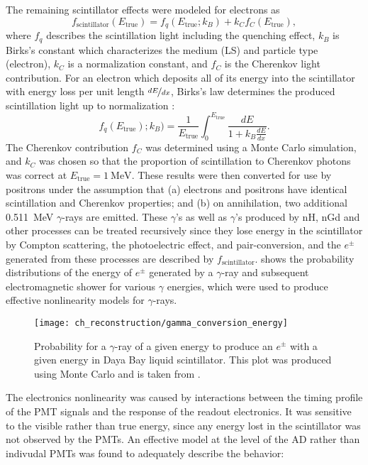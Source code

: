 The remaining scintillator effects were modeled for electrons as
\begin{equation}
    f_{\text{scintillator}}(E_{\text{true}}) =
    f_q(E_{\text{true}};k_B) + k_Cf_C(E_{\text{true}}),
\end{equation}
where $f_q$ describes the scintillation light including the quenching effect,
$k_B$ is Birks's constant which characterizes the medium (LS)
and particle type (electron),
$k_C$ is a normalization constant,
and $f_C$ is the Cherenkov light contribution.
For an electron which deposits all of its energy into the scintillator
with energy loss per unit length $\nicefrac{dE}{dx}$,
Birks's law determines the produced scintillation light up to normalization \cite{birks}:
\begin{equation}
    f_q(E_{\text{true}});k_B) = \frac{1}{E_{\text{true}}} \int_0^{E_{\text{true}}}
    \frac{dE}{1+k_B\frac{dE}{dx}}.
\end{equation}
The Cherenkov contribution $f_C$ was determined using a Monte Carlo simulation,
and $k_C$ was chosen so that the proportion of scintillation to Cherenkov photons
was correct at $E_{\text{true}} = \SI{1}{\MeV}$.
These results were then converted for use by positrons under the assumption that
(a) electrons and positrons have identical scintillation and Cherenkov properties;
and (b) on annihilation, two additional \SI{0.511}{\MeV} $\gamma$-rays are emitted.
These $\gamma$'s as well as $\gamma$'s produced by nH, nGd and other processes
can be treated recursively
since they lose energy in the scintillator
by Compton scattering, the photoelectric effect, and pair-conversion,
and the $e^{\pm}$ generated from these processes
are described by $f_{\text{scintillator}}$.
 shows the probability distributions
of the energy of $e^{\pm}$ generated by a $\gamma$-ray
and subsequent electromagnetic shower for various $\gamma$ energies,
which were used to produce effective nonlinearity models for $\gamma$-rays.

\begin{figure}
    \centering
    \texttt{[image: ch\_reconstruction/gamma\_conversion\_energy]}
    \caption{
        Probability for a $\gamma$-ray of a given energy to produce
        an $e^{\pm}$ with a given energy in Daya Bay liquid scintillator.
        This plot was produced using Monte Carlo and is taken from \cite{nonlinearity1}.
    }
    \label{fig:gamma_conversion}
\end{figure}

The electronics nonlinearity was caused by interactions between
the timing profile of the PMT signals and the response of the readout electronics.
It was sensitive to the visible rather than true energy,
since any energy lost in the scintillator was not observed by the PMTs.
An effective model at the level of the AD rather than indivudal PMTs
was found to adequately describe the behavior:
